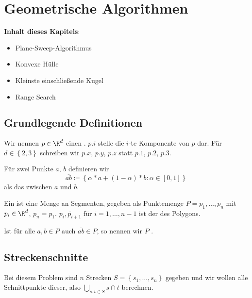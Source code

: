 \chapter{Geometrische Algorithmen}

\begin{tcolorbox}[colframe=black!3!white]
  \textbf{Inhalt dieses Kapitels}:
  \tcblower{} 
  \begin{itemize}
    \item Plane-Sweep-Algorithmus
    \item Konvexe Hülle
    \item Kleinste einschließende Kugel
    \item Range Search
  \end{itemize}
\end{tcolorbox}

\section{Grundlegende Definitionen}

Wir nennen \( p \in \R^d \) einen . \( p\text{.}i \) stelle die \( i \)-te Komponente von \( p \) dar. Für \( d \in \left \{ 2,3 \right \} \) schreiben wir \( p\text{.}x \), \( p\text{.}y \), \( p\text{.}z \) statt \( p\text{.}1 \), \( p\text{.}2 \), \( p\text{.}3 \).

Für zwei Punkte \( a \), \( b \) definieren wir 
\begin{equation*}
  \overline{ab} \coloneqq \left \{ \alpha *a + (1-\alpha)*b : \alpha \in [0,1] \right \}
\end{equation*}
als das  zwischen \( a \) und \( b \).

Ein  ist eine Menge an Segmenten, gegeben als Punktemenge \( P = p_1, \dots, p_n \) mit \( p_i \in \R^d \), \( p_n = p_1 \). \( \overline{p_i, p_{i+1}} \) für \( i = 1,\dots,n-1 \) ist der  des Polygons.

Ist für alle \( a,b \in P \) auch \( \overline{ab} \in P \), so nennen wir \( P \) .

\section{Streckenschnitte}

Bei diesem Problem sind \( n \) Strecken \( S = \left \{ s_1, \dots, s_n \right \} \) gegeben und wir wollen alle Schnittpunkte dieser, also \( \bigcup_{s,t \in S} s \cap t \) berechnen.

